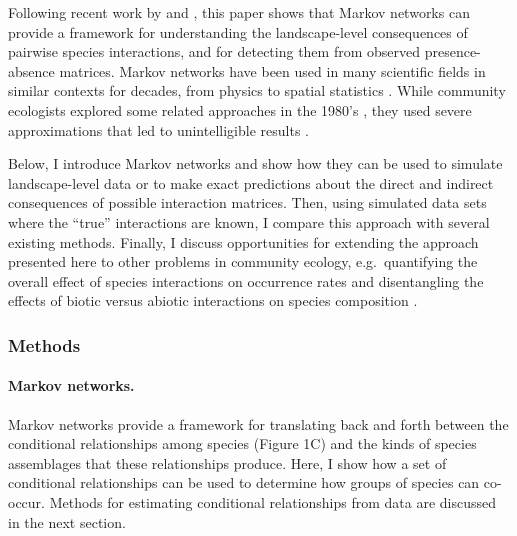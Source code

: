Following recent work by \citet{azaele_inferring_2010} and
\citet{fort_statistical_2013}, this paper shows that Markov networks
\citep[undirected graphical models also known as Markov random
fields;][]{murphy_machine_2012} can provide a framework for
understanding the landscape-level consequences of pairwise species
interactions, and for detecting them from observed presence-absence
matrices. Markov networks have been used in many scientific fields in
similar contexts for decades, from physics \citep[where nearby particles
interact magnetically;][]{cipra_introduction_1987} to spatial statistics
\citep[where adjacent grid cells have correlated
values;][]{harris_contact_1974, gelfand_modelling_2005}. While community
ecologists explored some related approaches in the 1980's
\citep{whittam_species_1981}, they used severe approximations that led
to unintelligible results \citep[e.g. ``probabilities'' greater than
one;][]{gilpin_factors_1982}.

Below, I introduce Markov networks and show how they can be used to
simulate landscape-level data or to make exact predictions about the
direct and indirect consequences of possible interaction matrices. Then,
using simulated data sets where the ``true'' interactions are known, I
compare this approach with several existing methods. Finally, I discuss
opportunities for extending the approach presented here to other
problems in community ecology, e.g.~quantifying the overall effect of
species interactions on occurrence rates
\citep{roughgarden_competition_1983} and disentangling the effects of
biotic versus abiotic interactions on species composition
\citep{kissling_towards_2012, pollock_understanding_2014}.

\subsubsection{Methods}\label{methods}

\paragraph{Markov networks.}\label{markov-networks.}

Markov networks provide a framework for translating back and forth
between the conditional relationships among species (Figure 1C) and the
kinds of species assemblages that these relationships produce. Here, I
show how a set of conditional relationships can be used to determine how
groups of species can co-occur. Methods for estimating conditional
relationships from data are discussed in the next section.

